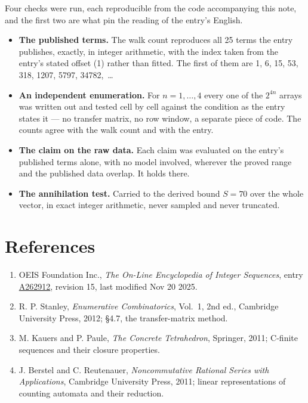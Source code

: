 \documentclass[11pt]{article}
\theoremstyle{definition}
\begin{document}
Four checks were run, each reproducible from the code accompanying this note, and the first two are what pin the reading of the entry's English.

\begin{itemize}

\item {\bfseries The published terms.} The walk count reproduces all 25 terms the entry publishes, exactly, in integer arithmetic, with the index taken from the entry's stated offset (1) rather than fitted. The first of them are 1, 6, 15, 53, 318, 1207, 5797, 34782,~\dots

\item {\bfseries An independent enumeration.} For $n = 1,\dots,4$ every one of the $2^{4n}$ arrays was written out and tested cell by cell against the condition as the entry states it --- no transfer matrix, no row window, a separate piece of code. The counts agree with the walk count and with the entry.

\item {\bfseries The claim on the raw data.} Each claim was evaluated on the entry's published terms alone, with no model involved, wherever the proved range and the published data overlap. It holds there.

\item {\bfseries The annihilation test.} Carried to the derived bound $S = 70$ over the whole vector, in exact integer arithmetic, never sampled and never truncated.

\end{itemize}

\section{References}

\begin{enumerate}

\item OEIS Foundation Inc., \emph{The On-Line Encyclopedia of Integer Sequences}, entry \href{https://oeis.org/A262912}{A262912}, revision 15, last modified Nov 20 2025.

\item R. P. Stanley, \emph{Enumerative Combinatorics}, Vol.~1, 2nd ed., Cambridge University Press, 2012; \S4.7, the transfer-matrix method.

\item M. Kauers and P. Paule, \emph{The Concrete Tetrahedron}, Springer, 2011; C-finite sequences and their closure properties.

\item J. Berstel and C. Reutenauer, \emph{Noncommutative Rational Series with Applications}, Cambridge University Press, 2011; linear representations of counting automata and their reduction.

\end{enumerate}
\end{document}
